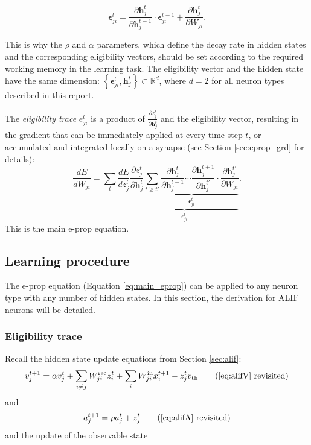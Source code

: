         \begin{equation}
        \bm{\epsilon}^t_{ji} = \frac{\partial\mathbf{h}_j^{t}}{\partial\mathbf{h}_j^{t-1}}\cdot\bm{\epsilon}^{t-1}_{ji} + \frac{\partial\mathbf{h}^t_j}{\partial W_{ji}}.
        \end{equation}

        This is why the $\rho$ and $\alpha$ parameters, which define the decay rate in hidden states and the corresponding eligibility vectors, should be set according to the required working memory in the learning task.
        The eligibility vector and the hidden state have the same dimension: $\left\{\bm{\epsilon}^t_{ji}, \mathbf{h}^t_j\right\} \subset \mathbb{R}^d$, where $d=2$ for all neuron types described in this report.

        The \emph{eligibility trace} $e^t_{ji}$ is a product of $\frac{\partial z_j^t}{\partial \mathbf{h}_j^t}$ and the eligibility vector, resulting in the gradient that can be immediately applied at every time step $t$, or accumulated and integrated locally on a synapse (see Section \ref{sec:eprop_grd} for details):
        \begin{equation}\label{eq:main_eprop}
        \frac{dE}{dW_{ji}} = \sum_t\frac{dE}{dz_j^t}\underbrace{\frac{\partial z_j^t}{\partial\mathbf{h}_j^t}\underbrace{\sum_{t\geq t'}\frac{\partial\mathbf{h}^t_j}{\partial\mathbf{h}_j^{t-1}} \cdots \frac{\partial\mathbf{h}_j^{t+1}}{\partial\mathbf{h}_j^{t'}}\cdot\frac{\partial\mathbf{h}_j^{t'}}{\partial W_{ji}}}_{\bm{\epsilon}_{ji}^t}}_{e^t_{ji}}.
        \end{equation}
        This is the main e-prop equation.

    \subsection{Learning procedure}

        The e-prop equation (Equation \ref{eq:main_eprop}) can be applied to any neuron type with any number of hidden states.
        In this section, the derivation for ALIF neurons will be detailed.

        \subsubsection{Eligibility trace}
            Recall the hidden state update equations from Section \ref{sec:alif}:
            \begin{equation*}
            v^{t+1}_j = \alpha v_j^t + \sum_{i\neq j}W^\text{rec}_{ji}z_i^t + \sum_i W^\text{in}_{ji}x_i^{t+1} - z_j^tv_
            \text{th} \tag{\ref{eq:alifV} revisited}
            \end{equation*}
            and
            \begin{equation*}
            a^{t+1}_j = \rho a^t_j + z^t_j \tag{\ref{eq:alifA} revisited}
            \end{equation*}
            and the update of the observable state

